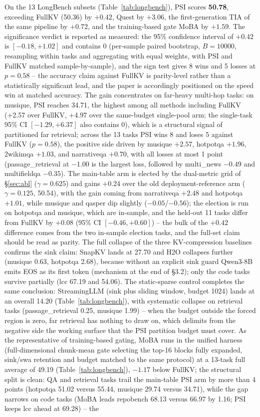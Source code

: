 \documentclass[11pt]{article}
\begin{document}
On the 13 LongBench subsets (Table~\ref{tab:longbench}), PSI scores \textbf{50.78}, exceeding FullKV (50.36) by $+0.42$, Quest by $+3.06$, the first-generation TIA of the same pipeline by $+0.72$, and the training-based gate MoBA by $+1.59$. The significance verdict is reported as measured: the 95\% confidence interval of $+0.42$ is $[-0.18, +1.02]$ and contains 0 (per-sample paired bootstrap, $B{=}10000$, resampling within tasks and aggregating with equal weights, with PSI and FullKV matched sample-by-sample), and the sign test gives 8 wins and 5 losses at $p{=}0.58$ -- the accuracy claim against FullKV is parity-level rather than a statistically significant lead, and the paper is accordingly positioned on the speed win at matched accuracy. The gain concentrates on far-heavy multi-hop tasks: on musique, PSI reaches 34.71, the highest among all methods including FullKV (+2.57 over FullKV, +4.97 over the same-budget single-pool arm; the single-task 95\% CI $[-1.29, +6.37]$ also contains 0), which is a structural signal of partitioned far retrieval; across the 13 tasks PSI wins 8 and loses 5 against FullKV ($p{=}0.58$), the positive side driven by musique $+2.57$, hotpotqa $+1.96$, 2wikimqa $+1.03$, and narrativeqa $+0.70$, with all losses at most 1 point (passage\_retrieval at $-1.00$ is the largest loss, followed by multi\_news $-0.49$ and multifieldqa $-0.35$). The main-table arm is elected by the dual-metric grid of \S\ref{sec:abl} ($\gamma{=}0.625$) and gains $+0.24$ over the old deployment-reference arm ($\gamma{=}0.125$, 50.54), with the gain coming from narrativeqa $+2.48$ and hotpotqa $+1.01$, while musique and qasper dip slightly ($-0.05$/$-0.56$); the election is run on hotpotqa and musique, which are in-sample, and the held-out 11 tasks differ from FullKV by $+0.08$ (95\% CI $[-0.46, +0.60]$) -- the bulk of the $+0.42$ difference comes from the two in-sample election tasks, and the full-set claim should be read as parity. The full collapse of the three KV-compression baselines confirms the sink claim: SnapKV lands at 27.70 and H2O collapses further (musique 0.63, hotpotqa 2.68), because without an explicit sink guard Qwen3-8B emits EOS as its first token (mechanism at the end of \S3.2); only the code tasks survive partially (lcc 67.19 and 54.06). The static-sparse control completes the same conclusion: StreamingLLM (sink plus sliding window, budget 1024) lands at an overall 14.20 (Table~\ref{tab:longbench}), with systematic collapse on retrieval tasks (passage\_retrieval 0.25, musique 1.99) -- when the budget outside the forced region is zero, far retrieval has nothing to draw on, which delimits from the negative side the working surface that the PSI partition budget must cover. As the representative of training-based gating, MoBA runs in the unified harness (full-dimensional chunk-mean gate selecting the top-16 blocks fully expanded, sink/swa retention and budget matched to the same protocol) at a 13-task full average of 49.19 (Table~\ref{tab:longbench}), $-1.17$ below FullKV; the structural split is clean: QA and retrieval tasks trail the main-table PSI arm by more than 4 points (hotpotqa 51.02 versus 55.44, musique 29.74 versus 34.71), while the gap narrows on code tasks (MoBA leads repobench 68.13 versus 66.97 by 1.16; PSI keeps lcc ahead at 69.28) -- the 
\end{document}
